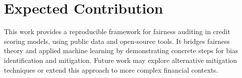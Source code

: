 \section{Expected Contribution}
This work provides a reproducible framework for fairness auditing in credit scoring models, using public data and open-source tools. It bridges fairness theory and applied machine learning by demonstrating concrete steps for bias identification and mitigation. Future work may explore alternative mitigation techniques or extend this approach to more complex financial contexts.